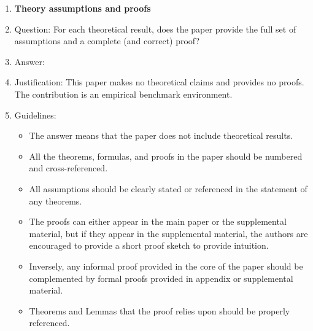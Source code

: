 \begin{enumerate}
\item {\bf Theory assumptions and proofs}
    \item[] Question: For each theoretical result, does the paper provide the full set of assumptions and a complete (and correct) proof?
    \item[] Answer: \answerNA{}
    \item[] Justification: This paper makes no theoretical claims and provides no proofs. The contribution is an empirical benchmark environment.
    \item[] Guidelines: \begin{itemize}
        \item The answer \answerNA{} means that the paper does not include theoretical results.
        \item All the theorems, formulas, and proofs in the paper should be numbered and cross-referenced.
        \item All assumptions should be clearly stated or referenced in the statement of any theorems.
        \item The proofs can either appear in the main paper or the supplemental material, but if they appear in the supplemental material, the authors are encouraged to provide a short proof sketch to provide intuition.
        \item Inversely, any informal proof provided in the core of the paper should be complemented by formal proofs provided in appendix or supplemental material.
        \item Theorems and Lemmas that the proof relies upon should be properly referenced.
    \end{itemize}


\end{enumerate}
